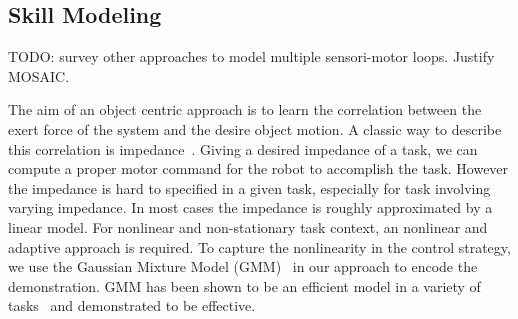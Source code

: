 

\subsection{Skill Modeling}
TODO: survey other approaches to model multiple sensori-motor loops. Justify MOSAIC.

The aim of an object centric approach is to learn the correlation between the exert force of the system and the desire object motion. A classic way to describe this correlation is impedance~\cite{howard2010transferring,wimbock2012comparison}. Giving a desired impedance of a task, we can compute a proper motor command for the robot to accomplish the task. However the impedance is hard to specified in a given task, especially for task involving varying impedance. In most cases the impedance is roughly approximated by a linear model. For nonlinear and non-stationary task context, an nonlinear and adaptive approach is required.
To capture the nonlinearity in the control strategy, we use the Gaussian Mixture Model (GMM)~\cite{cohn1996active} in our approach to encode the demonstration. GMM has been shown to be an efficient model in a variety of tasks~\cite{huang2013learning,sauser2011iterative,calinon2007incremental} and demonstrated to be effective.
%

